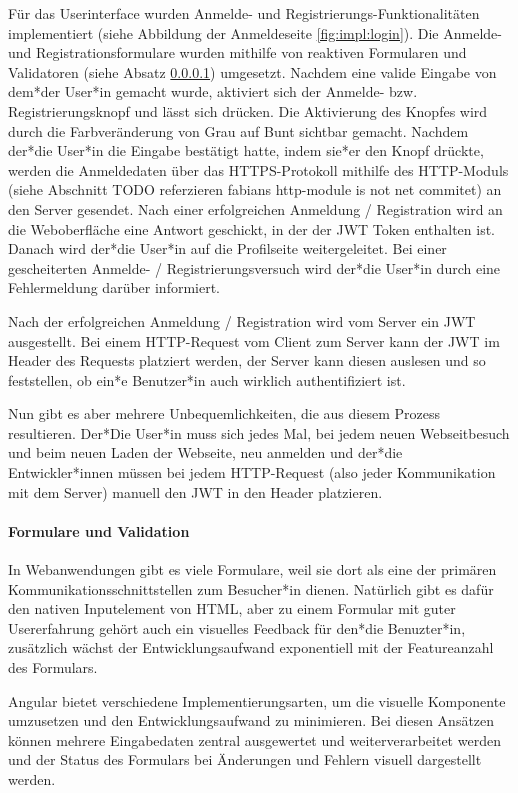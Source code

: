 Für das Userinterface wurden Anmelde- und Registrierungs-Funktionalitäten implementiert (siehe Abbildung der Anmeldeseite \ref{fig:impl:login}). Die Anmelde- und Registrationsformulare wurden mithilfe von reaktiven Formularen und Validatoren (siehe Absatz \ref{par:impl:usermanagment:reactiveForms}) umgesetzt. Nachdem eine valide Eingabe von dem*der User*in gemacht wurde, aktiviert sich der Anmelde- bzw. Registrierungsknopf und lässt sich drücken. Die Aktivierung des Knopfes wird durch die Farbveränderung von Grau auf Bunt sichtbar gemacht.  Nachdem der*die User*in die Eingabe bestätigt hatte, indem sie*er den Knopf drückte, werden die Anmeldedaten über das HTTPS-Protokoll mithilfe des HTTP-Moduls (siehe Abschnitt TODO referzieren fabians http-module is not net commitet) an den Server gesendet. Nach einer erfolgreichen Anmeldung / Registration wird an die Weboberfläche eine Antwort geschickt, in der der JWT Token enthalten ist. Danach wird der*die User*in auf die Profilseite weitergeleitet. Bei einer gescheiterten Anmelde- / Registrierungsversuch wird der*die User*in durch eine Fehlermeldung darüber informiert.

Nach der erfolgreichen Anmeldung / Registration wird vom Server ein JWT ausgestellt. Bei einem HTTP-Request vom Client zum Server kann der JWT im Header des Requests platziert werden, der Server kann diesen auslesen und so feststellen, ob ein*e Benutzer*in auch wirklich authentifiziert ist.

Nun gibt es aber mehrere Unbequemlichkeiten, die aus diesem Prozess resultieren. Der*Die User*in muss sich jedes Mal, bei jedem neuen Webseitbesuch und beim neuen Laden der Webseite, neu anmelden und der*die Entwickler*innen müssen bei jedem HTTP-Request (also jeder Kommunikation mit dem Server) manuell den JWT in den Header platzieren.

\paragraph{Formulare und Validation}
\label{par:impl:usermanagment:reactiveForms}
In Webanwendungen gibt es viele Formulare, weil sie dort als eine der primären Kommunikationsschnittstellen zum Besucher*in dienen. Natürlich gibt es dafür den nativen Inputelement von HTML, aber zu einem Formular mit guter Usererfahrung gehört auch ein visuelles Feedback für den*die Benuzter*in, zusätzlich wächst der Entwicklungsaufwand exponentiell mit der Featureanzahl des Formulars.

Angular bietet verschiedene Implementierungsarten, um die visuelle Komponente umzusetzen und den Entwicklungsaufwand zu minimieren. Bei diesen Ansätzen können mehrere Eingabedaten zentral ausgewertet und weiterverarbeitet werden und der Status des Formulars bei Änderungen und Fehlern visuell dargestellt werden.


